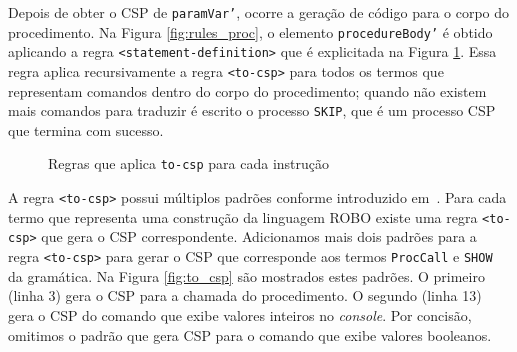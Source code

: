 Depois de obter o CSP de \texttt{paramVar'}, ocorre a geração de código para o corpo do procedimento.
Na Figura \ref{fig:rules_proc}, o elemento \texttt{procedureBody'} é obtido aplicando a regra \texttt{<statement-definition>} que é explicitada na Figura \ref{fig:statement}. Essa regra aplica recursivamente a regra \texttt{<to-csp>} para todos os termos que representam comandos dentro do corpo do procedimento; quando não existem mais comandos para traduzir é escrito o processo \texttt{SKIP}, que é um processo CSP que termina com sucesso.

\begin{figure}[!h]
\centering
\caption{Regras que aplica \texttt{to-csp} para cada instrução}

\label{fig:statement}
\end{figure}

A regra \texttt{<to-csp>} possui múltiplos padrões conforme introduzido em~\cite{nogueira}. Para cada termo que representa uma construção da linguagem ROBO existe uma regra \texttt{<to-csp>} que gera o CSP correspondente.
Adicionamos mais dois padrões para a regra \texttt{<to-csp>} para gerar o CSP que corresponde aos termos \texttt{ProcCall} e \texttt{SHOW} da gramática. Na Figura \ref{fig:to_csp} são mostrados estes padrões. O primeiro (linha 3) gera o CSP para a chamada do procedimento. O segundo (linha 13) gera o CSP do comando que exibe valores inteiros no \textit{console}.
Por concisão, omitimos o padrão que gera CSP para o comando que exibe valores booleanos. 


